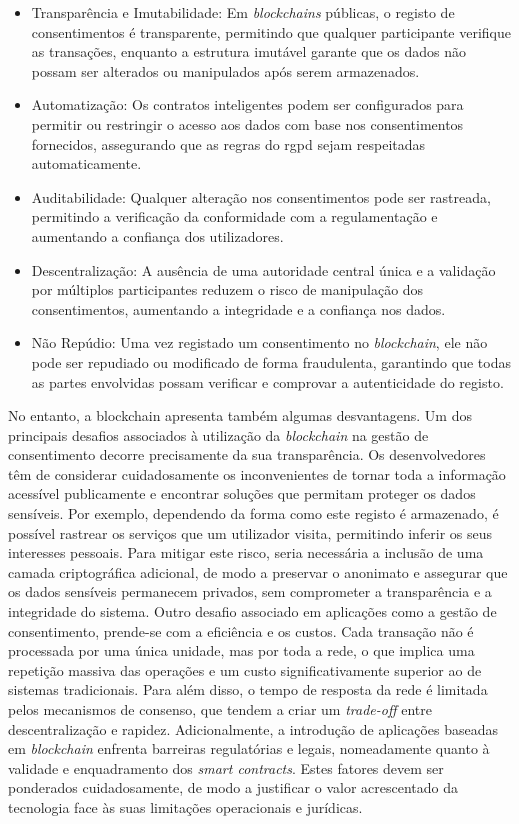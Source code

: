 \begin{itemize}
    \item Transparência e Imutabilidade: Em \textit{blockchains} públicas, o registo de consentimentos é transparente, permitindo que qualquer participante verifique as transações, enquanto a estrutura imutável garante que os dados não possam ser alterados ou manipulados após serem armazenados.
    \item Automatização: Os contratos inteligentes podem ser configurados para permitir ou restringir o acesso aos dados com base nos consentimentos fornecidos, assegurando que as regras do \acrshort{rgpd} sejam respeitadas automaticamente.
    \item Auditabilidade: Qualquer alteração nos consentimentos pode ser rastreada, permitindo a verificação da conformidade com a regulamentação e aumentando a confiança dos utilizadores.
    \item Descentralização: A ausência de uma autoridade central única e a validação por múltiplos participantes reduzem o risco de manipulação dos consentimentos, aumentando a integridade e a confiança nos dados.
    \item Não Repúdio: Uma vez registado um consentimento no \textit{blockchain}, ele não pode ser repudiado ou modificado de forma fraudulenta, garantindo que todas as partes envolvidas possam verificar e comprovar a autenticidade do registo.
\end{itemize}

No entanto, a blockchain apresenta também algumas desvantagens. Um dos principais desafios associados à utilização da \textit{blockchain} na gestão de consentimento decorre precisamente da sua transparência. Os desenvolvedores têm de considerar cuidadosamente os inconvenientes de tornar toda a informação acessível publicamente e encontrar soluções que permitam proteger os dados sensíveis. Por exemplo, dependendo da forma como este registo é armazenado, é possível rastrear os serviços que um utilizador visita, permitindo inferir os seus interesses pessoais. Para mitigar este risco, seria necessária a inclusão de uma camada criptográfica adicional, de modo a preservar o anonimato e assegurar que os dados sensíveis permanecem privados, sem comprometer a transparência e a integridade do sistema.
Outro desafio associado em aplicações como a gestão de consentimento, prende-se com a eficiência e os custos. Cada transação não é processada por uma única unidade, mas por toda a rede, o que implica uma repetição massiva das operações e um custo significativamente superior ao de sistemas tradicionais. Para além disso, o tempo de resposta da rede é limitada pelos mecanismos de consenso, que tendem a criar um \textit{trade-off} entre descentralização e rapidez. Adicionalmente, a introdução de aplicações baseadas em \textit{blockchain} enfrenta barreiras regulatórias e legais, nomeadamente quanto à validade e enquadramento dos \textit{smart contracts}. Estes fatores devem ser ponderados cuidadosamente, de modo a justificar o valor acrescentado da tecnologia face às suas limitações operacionais e jurídicas.

